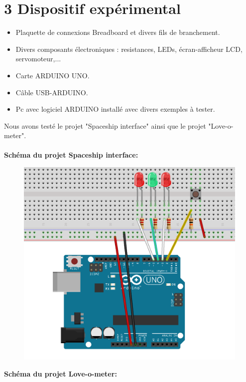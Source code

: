 \documentclass{report}
\begin{document}
\section*{3 Dispositif exp\'erimental}
\begin{itemize}
\item Plaquette de connexions Breadboard et divers fils de branchement.
\item Divers composants électroniques : resistances, LEDs, écran-afficheur LCD, servomoteur,...
\item Carte ARDUINO UNO.
\item Câble USB-ARDUINO.
\item Pc avec logiciel ARDUINO installé avec divers exemples à tester.\\
\end{itemize}
\newpage
Nous avons testé le projet "Spaceship interface" ainsi que le projet "Love-o-meter".\\
\\
\textbf{Schéma du projet Spaceship interface: }
\begin{figure}[h!]
\centering
\includegraphics[scale=0.25]{SpaceInt.png}
\end{figure}
\newpage
\textbf{Schéma du projet Love-o-meter: }
\end{document}
